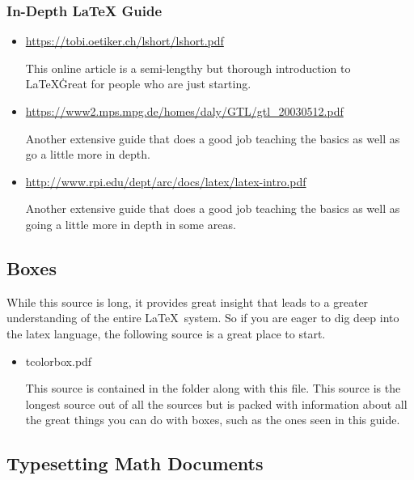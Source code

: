 		\subsubsection{In-Depth LaTeX Guide}
			\begin{itemize}
				\item \url{https://tobi.oetiker.ch/lshort/lshort.pdf}
						\begin{absquote}
							This online article is a semi-lengthy but thorough introduction to \LaTeX\. Great for people who are just starting.
						\end{absquote}
				\item \url{https://www2.mps.mpg.de/homes/daly/GTL/gtl_20030512.pdf}
						\begin{absquote}
							Another extensive guide that does a good job teaching the basics as well as go a little more in depth.
						\end{absquote}
				\item \url{http://www.rpi.edu/dept/arc/docs/latex/latex-intro.pdf}
						\begin{absquote}
							Another extensive guide that does a good job teaching the basics as well as going a little more in depth in some areas. 
						\end{absquote}
			\end{itemize}
	\subsection{Boxes}
		While this source is long, it provides great insight that leads to a greater understanding of the entire \LaTeX \, system. So if you are eager to dig deep into the latex language, the following source is a great place to start.
		\begin{itemize}
			\item tcolorbox.pdf
				\begin{absquote}
					This source is contained in the folder along with this file. This source is the longest source out of all the sources but is packed with information about all the great things you can do with boxes, such as the ones seen in this guide.	
				\end{absquote}
		\end{itemize}
	\subsection{Typesetting Math Documents}\label{sec:exams}
